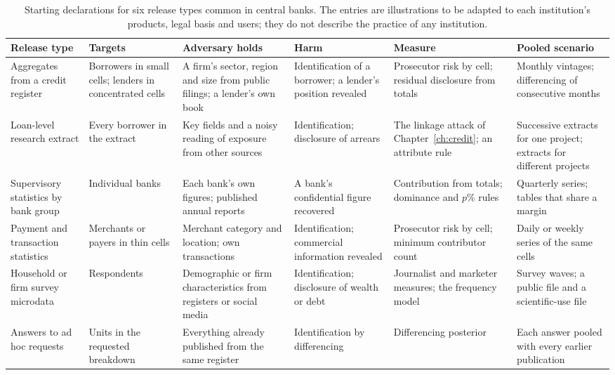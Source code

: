 \begin{table}[ht]
\centering
\caption{Starting declarations for six release types common in central banks. The
entries are illustrations to be adapted to each institution's products, legal basis
and users; they do not describe the practice of any institution.}
\label{c17:tab-map}
\footnotesize
\setlength{\tabcolsep}{3pt}
\begin{tabular}{@{}>{\raggedright\arraybackslash}p{2.2cm}>{\raggedright\arraybackslash}p{2.2cm}>{\raggedright\arraybackslash}p{2.5cm}>{\raggedright\arraybackslash}p{2.2cm}>{\raggedright\arraybackslash}p{2.5cm}>{\raggedright\arraybackslash}p{2.4cm}@{}}
\toprule
Release type & Targets & Adversary holds & Harm & Measure & Pooled scenario \\
\midrule
Aggregates from a credit register & Borrowers in small cells; lenders in
concentrated cells & A firm's sector, region and size from public filings; a
lender's own book & Identification of a borrower; a lender's position revealed &
Prosecutor risk by cell; residual disclosure from totals & Monthly vintages;
differencing of consecutive months \\
\addlinespace
Loan-level research extract & Every borrower in the extract & Key fields and a noisy
reading of exposure from other sources & Identification; disclosure of arrears &
The linkage attack of Chapter~\ref{ch:credit}; an attribute rule & Successive
extracts for one project; extracts for different projects \\
\addlinespace
Supervisory statistics by bank group & Individual banks & Each bank's own figures;
published annual reports & A bank's confidential figure recovered & Contribution
from totals; dominance and $p\%$ rules & Quarterly series; tables that share a
margin \\
\addlinespace
Payment and transaction statistics & Merchants or payers in thin cells & Merchant
category and location; own transactions & Identification; commercial information
revealed & Prosecutor risk by cell; minimum contributor count & Daily or weekly
series of the same cells \\
\addlinespace
Household or firm survey microdata & Respondents & Demographic or firm
characteristics from registers or social media & Identification; disclosure of
wealth or debt & Journalist and marketer measures; the frequency model & Survey
waves; a public file and a scientific-use file \\
\addlinespace
Answers to ad hoc requests & Units in the requested breakdown & Everything already
published from the same register & Identification by differencing & Differencing
posterior & Each answer pooled with every earlier publication \\
\bottomrule
\end{tabular}
\end{table}

